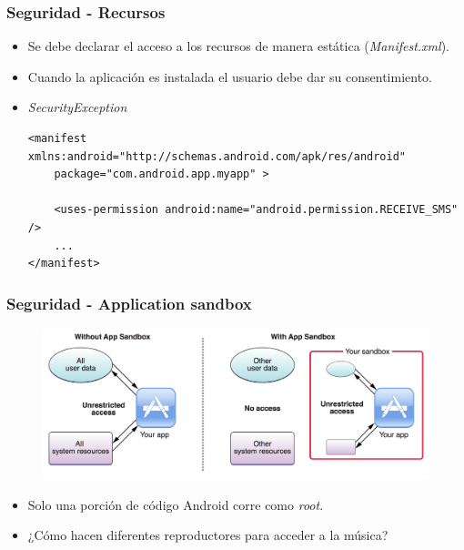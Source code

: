 \begin{frame}[fragile]
  \frametitle{Seguridad - Recursos}
  \begin{itemize}
    \item Se debe declarar el acceso a los recursos de manera estática (\textit{Manifest.xml}).
    
    \item Cuando la aplicación es instalada el usuario debe dar su consentimiento.
    
    \item \textit{SecurityException}
    \begin{lstlisting}
<manifest xmlns:android="http://schemas.android.com/apk/res/android"
    package="com.android.app.myapp" >

    <uses-permission android:name="android.permission.RECEIVE_SMS" />
    ...
</manifest>
    \end{lstlisting}    
  \end{itemize}
\end{frame}

\begin{frame}
  \frametitle{Seguridad - Application sandbox}
  \begin{figure}
    \centering
    \includegraphics[scale=0.2]{images/sandbox.png}
  \end{figure}
  
  \begin{itemize}
      \item Solo una porción de código Android corre como \textit{root}.
      
      \item ¿Cómo hacen diferentes reproductores para acceder a la música?
  \end{itemize}
\end{frame}

